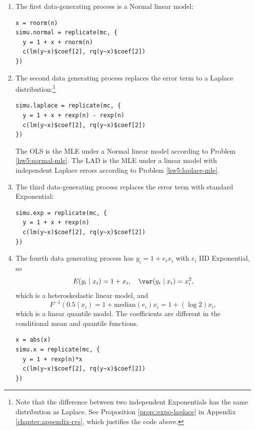 \begin{enumerate}[label=(D\arabic*), ref=D\arabic*]
\item 
The first data-generating process is a Normal linear model:

\begin{lstlisting}
x = rnorm(n)
simu.normal = replicate(mc, {
  y = 1 + x + rnorm(n)
  c(lm(y~x)$coef[2], rq(y~x)$coef[2])
})
\end{lstlisting}


\item 
The second data generating process replaces the error term to a Laplace distribution:\footnote{Note that the difference between two independent Exponentials has the same distribution as Laplace. See Proposition \ref{prop::expo-laplace} in Appendix \ref{chapter:appendix-rvs}, which justifies the  code above.}

\begin{lstlisting}
simu.laplace = replicate(mc, {
  y = 1 + x + rexp(n) - rexp(n)
  c(lm(y~x)$coef[2], rq(y~x)$coef[2])
})
\end{lstlisting}


The OLS is the MLE under a Normal linear model according to Problem \ref{hw5:normal-mle}. The LAD is the MLE under a linear model with independent Laplace errors according to Problem \ref{hw5:laplace-mle}.


\item 
The third data-generating process replaces the error term with standard Exponential:


\begin{lstlisting}
simu.exp = replicate(mc, {
  y = 1 + x + rexp(n) 
  c(lm(y~x)$coef[2], rq(y~x)$coef[2])
})
\end{lstlisting}


\item 
The fourth data generating process has $y_i = 1+e_i x_i$ with $e_i$ IID Exponential, so 
$$
E(y_i \mid x_i) = 1+x_i,\quad \var(y_i\mid x_i) = x_i^2,
$$
which is a heteroskedastic linear model,
and
$$
F^{-1}(0.5\mid x_i) = 1 + \text{median}(e_i) x_i = 1+ ( \log 2) x_i,
$$
which is a linear quantile model. The coefficients are different in the conditional mean and quantile functions. 


\begin{lstlisting}
x = abs(x)
simu.x = replicate(mc, {
  y = 1 + rexp(n)*x
  c(lm(y~x)$coef[2], rq(y~x)$coef[2])
})
\end{lstlisting}
\end{enumerate}


